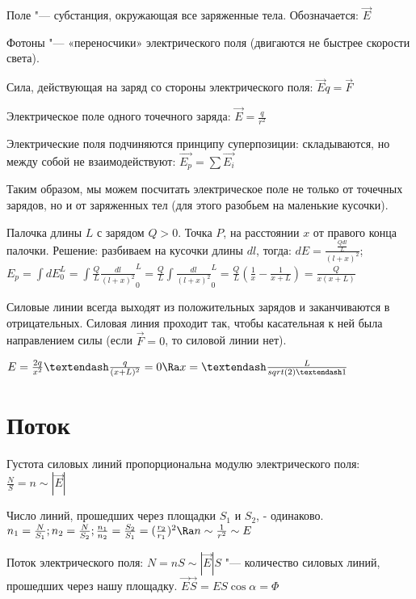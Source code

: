 Поле "--- субстанция, окружающая все заряженные тела. Обозначается: $\overrightarrow{E}$

Фотоны "--- «переносчики» электрического поля (двигаются не быстрее скорости света).

Сила, действующая на заряд со стороны электрического поля: $\overrightarrow{E}q = \overrightarrow{F}$

Электрическое поле одного точечного заряда: $\overrightarrow{E} = \frac{q}{r^2}$

Электрические поля подчиняются принципу суперпозиции: складываются, но между собой не взаимодействуют: $\overrightarrow{E_p} = \sum{\overrightarrow{E_i}}$

Таким образом, мы можем посчитать электрическое поле не только от точечных зарядов, но и от заряженных тел (для этого разобьем на маленькие кусочки).

\begin{exmp}
  Палочка длины $L$ с зарядом $Q > 0$. Точка $P$, на расстоянии $x$ от правого конца палочки.
  Решение: разбиваем на кусочки длины $dl$, тогда: $dE = \frac{\frac{Qdl}{L}}{(l + x)^2}$; $E_p = \int{dE}_0^L = \int{\frac{Q}{L}\frac{dl}{(l + x)^2}}_0^L = \frac{Q}{L}\int{\frac{dl}{(l + x)^2}}_0^L  = \frac{Q}{L}(\frac{1}{x} - \frac{1}{x + L}) = \frac{Q}{x(x + L)}$
\end{exmp}


Силовые линии всегда выходят из положительных зарядов и заканчиваются в отрицательных. Силовая линия проходит так, чтобы касательная к ней была направлением силы (если $\overrightarrow{F} = 0$, то силовой линии нет).

\begin{exmp}
 $E = \frac{2q}{x^2} – \frac{q}{(x + L)^2} = 0 \Ra x = – \frac{L}{sqrt(2) – 1}$
\end{exmp}



\section{Поток}
Густота силовых линий пропорциональна модулю электрического поля: $\frac{N}{S} = n \sim |\overrightarrow{E}|$


Число линий, прошедших через площадки $S_1$ и $S_2$, - одинаково. $n_1 = \frac{N}{S_1}; n_2 = \frac{N}{S_2}; \frac{n_1}{n_2} = \frac{S_2}{S_1} = (\frac{r_2}{r_1})^2 \Ra n \sim \frac{1}{r^2} \sim E$


Поток электрического поля: $N = nS \sim |\overrightarrow{E}|S$ "--- количество силовых линий, прошедших через нашу площадку. $\overrightarrow{E}\overrightarrow{S} = ES\cos{\alpha} = \Phi$


